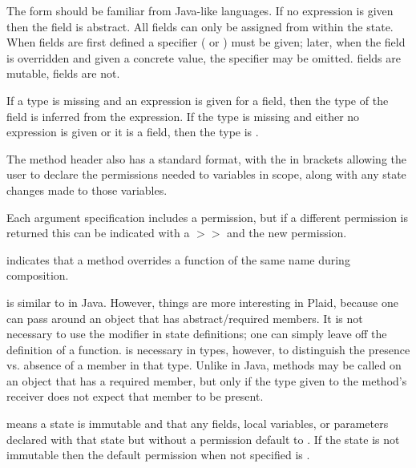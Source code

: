 The  form should be familiar from Java-like
languages.  If no expression is given then the field is abstract.  All
fields can only be assigned from within the
state.
When fields are first defined a specifier ( or )
must be given; later, when the field is overridden and given a concrete
value, the specifier may be omitted.
 fields are mutable,  fields
are not.

If a type is missing and an expression is given for a
   field, then the type of the field is inferred from the
  expression.  If the type is missing and either no expression is
  given or it is a  field, then the type is .

The method header  also has a standard
format, with the  in brackets allowing the user to declare
the permissions needed to variables in scope, along with any state
changes made to those variables.

Each argument specification includes a permission, but if a different
permission is returned this can be indicated with a $>>$ and the new
permission.

\begin{quote}



 {}

 {}

 {}

\end{quote}


 indicates that a method overrides a function of the
same name during composition.

 is similar to  in Java.  However,
things are more interesting in Plaid, because one can pass around an
object that has abstract/required members.  It is not necessary to
use the  modifier in state definitions; one can simply
leave off the definition of a function.   is necessary
in types, however, to distinguish the presence vs. absence of a
member in that type.  Unlike in Java, methods may be called on an
object that has a required member, but only if the type given to the
method's receiver does not expect that member to be present.

 means a state is immutable and that any fields,
local variables, or parameters declared with that state but without
a permission default to .  If the state is not immutable
then the default permission when not specified is .


